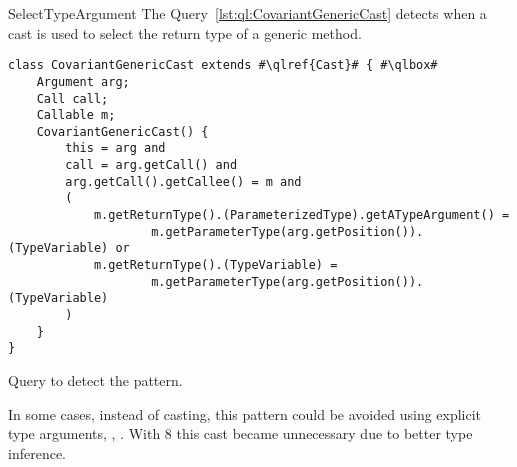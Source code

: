 \begin{pattern}{SelectTypeArgument}
\detection{}
The Query~\ref{lst:ql:CovariantGenericCast} detects when a cast is used to select the return type of a generic method.

\begin{listing}
\begin{verbatim}
class CovariantGenericCast extends #\qlref{Cast}# { #\qlbox#
	Argument arg;
	Call call;
	Callable m;
	CovariantGenericCast() {
		this = arg and
		call = arg.getCall() and
		arg.getCall().getCallee() = m and
		(
			m.getReturnType().(ParameterizedType).getATypeArgument() =
					m.getParameterType(arg.getPosition()).(TypeVariable) or
			m.getReturnType().(TypeVariable) =
					m.getParameterType(arg.getPosition()).(TypeVariable)
		)
	}
}
\end{verbatim}
\caption{Query to detect the \thisp{} pattern.}
\label{lst:ql:CovariantGenericCast}
\end{listing}


\issues{}
In some cases, instead of casting, this pattern could be avoided using explicit type arguments,
\eg{}, .
With \java{} 8 this cast became unnecessary due to better type inference.%
\end{pattern}
